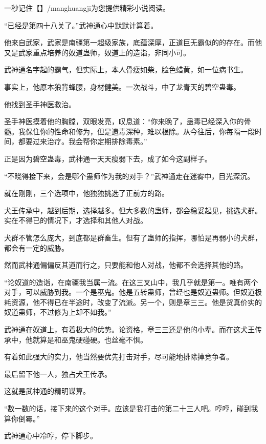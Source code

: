 
\begin{this_body}

一秒记住【】/manghuangji为您提供精彩小说阅读。

“已经是第四十八关了。”武神通心中默默计算着。

他来自武家，武家是南疆第一超级家族，底蕴深厚，正道巨无霸似的的存在。而他又是武家重点培养的奴道蛊师，奴道上的造诣，非同小可。

武神通名字起的霸气，但实际上，本人骨瘦如柴，脸色蜡黄，如一位病书生。

事实上，他原本狼背蜂腰，身材健美。一次战斗，中了龙青天的碧空蛊毒。

他找到圣手神医救治。

圣手神医摸着他的胸膛，双眼发亮，叹息道：“你来晚了，蛊毒已经深入你的骨髓。我保住你的性命和修为，但是遗毒深种，难以根除。从今往后，你每隔一段时间，都要过来治疗。我会帮你定期排除毒素。”

正是因为碧空蛊毒，武神通一天天瘦弱下去，成了如今这副样子。

“不晓得接下来，会是哪个蛊师作为我的对手？”武神通走在迷雾中，目光深沉。

就在刚刚，三个选项中，他独独挑选了正前方的路。

犬王传承中，越到后期，选择越多。但大多数的蛊师，都会稳妥起见，挑选犬群。实在不得已的情况下，才选择和其他人对战。

犬群不管怎么庞大，到底都是群畜生。但有了蛊师的指挥，哪怕是再弱小的犬群，都会有一定的威胁。

然而武神通偏偏反其道而行之，只要能和他人对战，他都不会选择其他的路。

“论奴道的造诣，在南疆我当属一流。在这三叉山中，我几乎就是第一。唯有两个对手，可以威胁到我。一个是巫鬼。他是五转蛊师，曾经也是奴道蛊师。但奴道极耗资源，他不得已在半途时，改变了流派。另一个，则是章三三。他是货真价实的奴道蛊师，不过修为上却不如我。”

武神通在奴道上，有着极大的优势。论资格，章三三还是他的小辈。而在这犬王传承中，他就算是和巫鬼硬碰硬。也丝毫不惧。

有着如此强大的实力，他当然要优先打击对手，尽可能地排除掉竞争者。

最后留下他一人，独占犬王传承。

这就是武神通的精明谋算。

“数一数的话，接下来的这个对手。应该是我打击的第二十三人吧。哼哼，碰到我算你倒霉。”

武神通心中冷哼，停下脚步。


\end{this_body}
